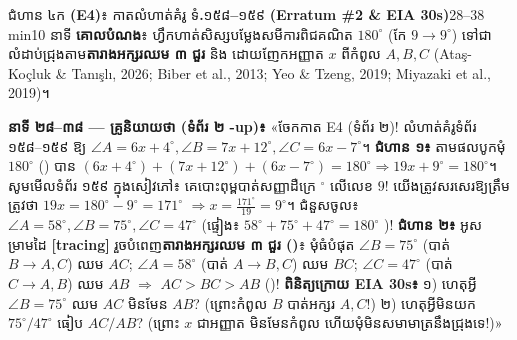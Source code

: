 \documentclass[a4paper,12pt]{article}
\newcommand{\en}[1]{{\TimesEn #1}}
\newcommand{\enbf}[1]{{\TimesEn\textbf{#1}}}
\newcommand{\cnum}[1]{{\TimesEn\fontsize{10.5pt}{12pt}\selectfont\ding{\numexpr181+#1\relax}}}
\newcommand{\ang}[1]{\ensuremath{\angle #1}}
\begin{document}
\Needspace{2.0cm}
\begin{phasebox}{ជំហាន ៤ក \enbf{(E4)}៖ កាតលំហាត់គំរូ ទំ\enbf{.}១៥៨\enbf{--}១៥៩ \enbf{(Erratum \#2 \& EIA 30s)}}{28--38 min}{10 នាទី}
\textbf{គោលបំណង}៖ ហ្វឹកហាត់សិស្សបម្លែងសមីការពិជគណិត $180^\circ$ (កែ $9 \to 9^\circ$) ទៅជាលំដាប់ជ្រុងតាម\textbf{តារាងអក្សរឈម ៣ ជួរ} និង \en{[tracing]} ដោយញែកអញ្ញាត $x$ ពីកំពូល $A, B, C$ \en{(Ataş-Koçluk \& Tanışlı, 2026; Biber et al., 2013; Yeo \& Tzeng, 2019; Miyazaki et al., 2019)}។
\end{phasebox}
\begin{scriptbox}
  \textbf{នាទី ២៨--៣៨ — គ្រូនិយាយថា (ទំព័រ ២ \en{2-up})៖} «ចែកកាត \en{E4} (ទំព័រ ២)! លំហាត់គំរូទំព័រ ១៥៨--១៥៩ ឱ្យ $\ang{A}=6x+4^\circ, \ang{B}=7x+12^\circ, \ang{C}=6x-7^\circ$។ \textbf{ជំហាន ១៖} តាមផលបូកមុំ $180^\circ$ (\cnum{5}) បាន $(6x+4^\circ)+(7x+12^\circ)+(6x-7^\circ)=180^\circ \Rightarrow 19x+9^\circ=180^\circ$។ សូមមើលទំព័រ ១៥៩ ក្នុងសៀវភៅ៖ គេបោះពុម្ពបាត់សញ្ញាដឺក្រេ $^\circ$ លើលេខ $9$! យើងត្រូវសរសេរឱ្យត្រឹមត្រូវថា \textbf{$19x = 180^\circ - 9^\circ = 171^\circ$} $\Rightarrow x = \frac{171^\circ}{19} = 9^\circ$។ ជំនួសចូល៖ $\ang{A}=58^\circ, \ang{B}=75^\circ, \ang{C}=47^\circ$ (ផ្ទៀង៖ $58^\circ+75^\circ+47^\circ=180^\circ$ )! \textbf{ជំហាន ២៖} អូសម្រាមដៃ \en{\textbf{[tracing]}} រួចបំពេញ\textbf{តារាងអក្សរឈម ៣ ជួរ (\cnum{1})}៖ មុំធំបំផុត $\ang{B}=75^\circ$ (បាត់ $B \to A,C$) ឈម $AC$; $\ang{A}=58^\circ$ (បាត់ $A \to B,C$) ឈម $BC$; $\ang{C}=47^\circ$ (បាត់ $C \to A,B$) ឈម $AB$ $\Rightarrow$ \textbf{$AC > BC > AB$} (\cnum{3})! \textbf{ពិនិត្យក្រោយ \en{EIA 30s}៖} ១) ហេតុអ្វី $\ang{B}=75^\circ$ ឈម $AC$ មិនមែន $AB$? (ព្រោះកំពូល $B$ បាត់អក្សរ $A, C$!) ២) ហេតុអ្វីមិនយក $75^\circ/47^\circ$ ធៀប $AC/AB$? (ព្រោះ $x$ ជាអញ្ញាត មិនមែនកំពូល ហើយមុំមិនសមាមាត្រនឹងជ្រុងទេ!)»
\end{scriptbox}
\end{document}
